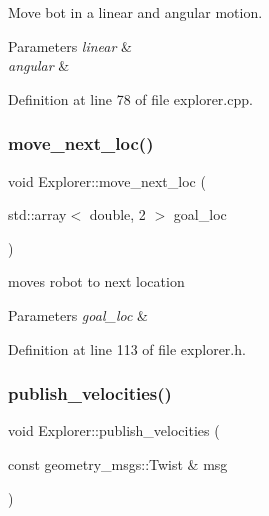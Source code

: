 Move bot in a linear and angular motion. 


\begin{DoxyParams}{Parameters}
{\em linear} & \\
\hline
{\em angular} & \\
\hline
\end{DoxyParams}


Definition at line 78 of file explorer.\+cpp.

\mbox{\label{class_explorer_a2b0c1e46e1a17e99f4156edf5a93b691}} 
\subsubsection{\texorpdfstring{move\+\_\+next\+\_\+loc()}{move\_next\_loc()}}
{\footnotesize\ttfamily void Explorer\+::move\+\_\+next\+\_\+loc (\begin{DoxyParamCaption}\item[{std\+::array$<$ double, 2 $>$}]{goal\+\_\+loc }\end{DoxyParamCaption})\hspace{0.3cm}{\ttfamily [inline]}}



moves robot to next location 


\begin{DoxyParams}{Parameters}
{\em goal\+\_\+loc} & \\
\hline
\end{DoxyParams}


Definition at line 113 of file explorer.\+h.

\mbox{\label{class_explorer_a8ffef25585ef957b9df4407366723787}} 
\subsubsection{\texorpdfstring{publish\+\_\+velocities()}{publish\_velocities()}}
{\footnotesize\ttfamily void Explorer\+::publish\+\_\+velocities (\begin{DoxyParamCaption}\item[{const geometry\+\_\+msgs\+::\+Twist \&}]{msg }\end{DoxyParamCaption})}



